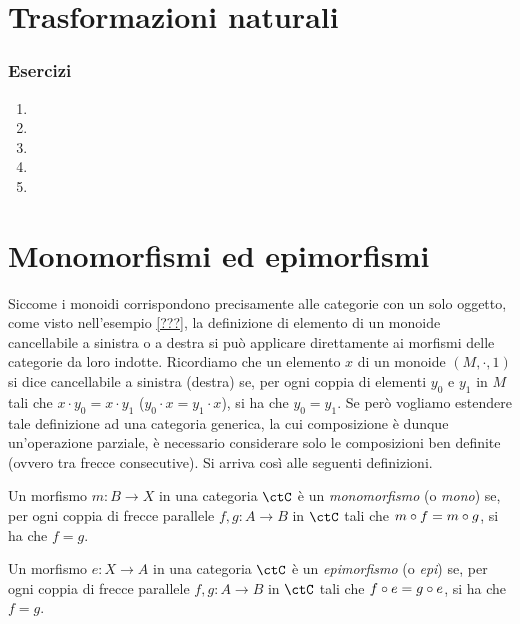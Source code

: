 \section{Trasformazioni naturali}

\subsubsection*{Esercizi}
\begin{enumerate}
    \item
    \item
    \item
    \item
    \item
\end{enumerate}

\section{Monomorfismi ed epimorfismi}

Siccome i monoidi corrispondono precisamente alle categorie con un solo oggetto, come visto nell'esempio \ref{???},
la definizione di elemento di un monoide cancellabile a sinistra o a destra si può applicare direttamente ai morfismi delle categorie da loro indotte.
Ricordiamo che un elemento \(x\) di un monoide \((M, \cdot, 1)\) si dice cancellabile a sinistra (destra) se,
per ogni coppia di elementi \(y_0\) e \(y_1\) in \(M\) tali che \(x \cdot y_0 = x \cdot y_1\) (\(y_0 \cdot x = y_1 \cdot x\)),
si ha che \(y_0 = y_1\).
Se però vogliamo estendere tale definizione ad una categoria generica,
la cui composizione è dunque un'operazione parziale,
è necessario considerare solo le composizioni ben definite
(ovvero tra frecce consecutive).
Si arriva così alle seguenti definizioni.

\begin{definition}[Monomorfismo]\label{def_Mono}
	Un morfismo \(m \colon B \to X\) in una categoria \(\ctC\) è un \emph{monomorfismo} (o \emph{mono}) se,
	per ogni coppia di frecce parallele \(f, g \colon A \to B\) in \(\ctC\) tali che \(m \circ f = m \circ g\), si ha che \(f = g\).
\end{definition}

\begin{definition}[Epimorfismo]\label{def_Epi}
	Un morfismo \(e \colon X \to A\) in una categoria \(\ctC\) è un \emph{epimorfismo} (o \emph{epi}) se,
	per ogni coppia di frecce parallele \(f, g \colon A \to B\) in \(\ctC\) tali che \(f \circ e = g \circ e\), si ha che \(f = g\).
\end{definition}


